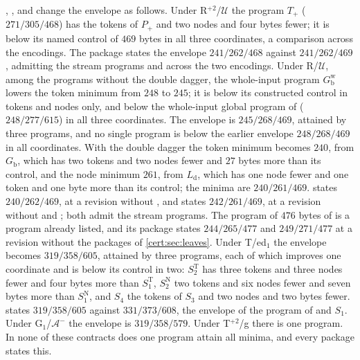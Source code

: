 , ,  and
 change the envelope as follows. Under
R$^{+2}$/$\mathcal U$ the program $T_{+}$ ($271/305/468$) has the tokens of
$P_{+}$ and two nodes and four bytes fewer; it is below its named control of
$469$ bytes in all three coordinates, a comparison across the encodings. The
package states the envelope $241/262/468$ against $241/262/469$, admitting the
stream programs and across the two encodings. Under R/$\mathcal U$, among the
programs without the double dagger, the whole-input program $G^{\mathrm w}_{\mathrm b}$
lowers the token minimum from $248$ to $245$; it is below its constructed control
in tokens and nodes only, and below the whole-input global program of
 ($248/277/615$) in all three coordinates. The
envelope is $245/268/469$, attained by three programs, and no single program is
below the earlier envelope $248/268/469$ in all coordinates. With the double
dagger the token minimum becomes $240$, from $G_{\mathrm b}$, which has two tokens
and two nodes fewer and $27$ bytes more than its control, and the node minimum
$261$, from $L_{\mathrm d}$, which has one node fewer and one token and one byte
more than its control; the minima are $240/261/469$.
 states $240/262/469$, at a revision without
, and  states $242/261/469$, at a revision without
 and ; both admit
the stream programs. The program of $476$ bytes of 
is a program already listed, and its package states $244/265/477$ and
$249/271/477$ at a revision without the packages of \cref{cert:sec:leaves}.
Under T/ed$_1$ the envelope becomes $319/358/605$, attained by three programs,
each of which improves one coordinate and is below its control in two:
$S^{\mathrm T}_2$ has three tokens and three nodes fewer and four bytes more than
$S^{\mathrm T}_1$, $S^{\mathrm N}_2$ two tokens and six nodes fewer and seven bytes
more than $S^{\mathrm N}_1$, and $S_4$ the tokens of $S_3$ and two nodes and two
bytes fewer.  states $319/358/605$ against
$331/373/608$, the envelope of the program of  and $S_1$. Under
G$_1$/$\mathcal A^{-}$ the envelope is $319/358/579$. Under T$^{+2}$/g there is
one program. In none of these contracts does one program attain all minima, and
every package states this.

